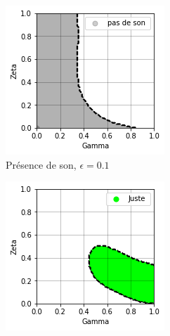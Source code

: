 \documentclass[french, twocolumn]{article}
\begin{document}
\begin{figure}[h!]
    \centering
    \begin{subfigure}[b]{.49\linewidth}
        \includegraphics[width=\linewidth]{img/sonV2.png}
        \caption{Présence de son, $\epsilon = 0.1$}
        \label{subfig:son}
    \end{subfigure}
    \hfill
    \begin{subfigure}[b]{.49\linewidth}
        \includegraphics[width=\linewidth]{img/justeV2.png}

\end{subfigure}
\end{figure}
\end{document}
